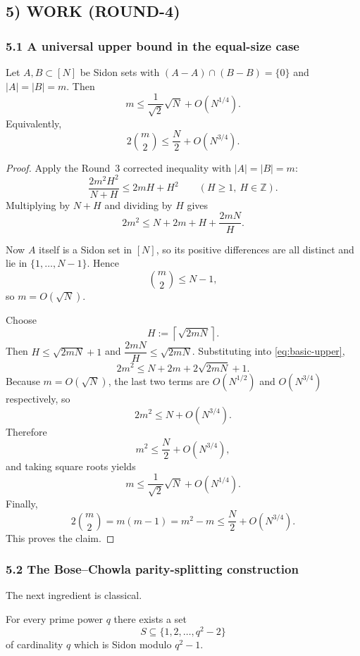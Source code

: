 \subsection{5) WORK (ROUND-4)}

\subsubsection{5.1 A universal upper bound in the equal-size case}

\begin{proposition}\label{prop:upper}
Let $A,B\subset[N]$ be Sidon sets with $(A-A)\cap(B-B)=\{0\}$ and $|A|=|B|=m$.  Then
\[
m\le \frac1{\sqrt2}\sqrt N+O(N^{1/4}).
\]
Equivalently,
\[
2\binom{m}{2}\le \frac N2+O(N^{3/4}).
\]
\end{proposition}

\begin{proof}
Apply the Round~3 corrected inequality with $|A|=|B|=m$:
\[
\frac{2m^2H^2}{N+H}\le 2mH+H^2
\qquad (H\ge 1,\ H\in\mathbb Z).
\]
Multiplying by $N+H$ and dividing by $H$ gives
\begin{equation}\label{eq:basic-upper}
2m^2\le N+2m+H+\frac{2mN}{H}.
\end{equation}

Now $A$ itself is a Sidon set in $[N]$, so its positive differences are all distinct and lie in $\{1,\dots,N-1\}$.  Hence
\[
\binom{m}{2}\le N-1,
\]
so $m=O(\sqrt N)$.

Choose
\[
H:=\left\lceil\sqrt{2mN}\right\rceil.
\]
Then $H\le \sqrt{2mN}+1$ and $\dfrac{2mN}{H}\le \sqrt{2mN}$.  Substituting into \eqref{eq:basic-upper},
\[
2m^2\le N+2m+2\sqrt{2mN}+1.
\]
Because $m=O(\sqrt N)$, the last two terms are $O(N^{1/2})$ and $O(N^{3/4})$ respectively, so
\[
2m^2\le N+O(N^{3/4}).
\]
Therefore
\[
m^2\le \frac N2+O(N^{3/4}),
\]
and taking square roots yields
\[
m\le \frac1{\sqrt2}\sqrt N+O(N^{1/4}).
\]
Finally,
\[
2\binom{m}{2}=m(m-1)=m^2-m\le \frac N2+O(N^{3/4}).
\]
This proves the claim.
\end{proof}

\subsubsection{5.2 The Bose--Chowla parity-splitting construction}

The next ingredient is classical.

\begin{theorem}\label{thm:BC}
For every prime power $q$ there exists a set
\[
S\subseteq\{1,2,\dots,q^2-2\}
\]
of cardinality $q$ which is Sidon modulo $q^2-1$.
\end{theorem}

